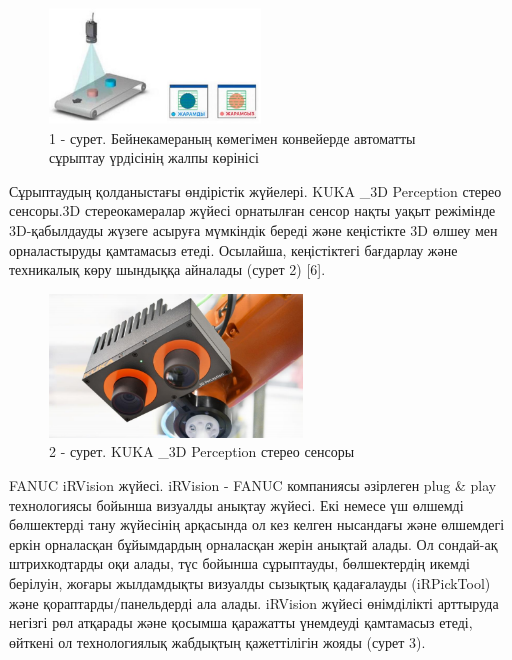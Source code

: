 \begin{figure}[H]
	\centering
	\includegraphics[width=0.5\textwidth]{media/ict2/image168}
	\caption*{1 - сурет. Бейнекамераның көмегімен конвейерде автоматты сұрыптау үрдісінің жалпы көрінісі}

\end{figure}

\begin{multicols}{2}
Сұрыптаудың қолданыстағы өндірістік жүйелері. KUKA \_3D Perception
стерео сенсоры.3D стереокамералар жүйесі орнатылған сенсор нақты уақыт
режімінде 3D-қабылдауды жүзеге асыруға мүмкіндік береді және кеңістікте
3D өлшеу мен орналастыруды қамтамасыз етеді. Осылайша, кеңістіктегі
бағдарлау және техникалық көру шындыққа айналады (сурет 2) {[}6{]}.
\end{multicols}

\begin{figure}[H]
	\centering
	\includegraphics[width=0.6\textwidth]{media/ict2/image169}
	\caption*{2 - сурет. KUKA \_3D Perception стерео сенсоры}
\end{figure}

\begin{multicols}{2}
FANUC iRVision жүйесі. iRVision - FANUC компаниясы әзірлеген plug \&
play технологиясы бойынша визуалды анықтау жүйесі. Екі немесе үш өлшемді
бөлшектерді тану жүйесінің арқасында ол кез келген нысандағы және
өлшемдегі еркін орналасқан бұйымдардың орналасқан жерін анықтай алады.
Ол сондай-ақ штрихкодтарды оқи алады, түс бойынша сұрыптауды,
бөлшектердің икемді берілуін, жоғары жылдамдықты визуалды сызықтық
қадағалауды (iRPickTool) және қораптарды/панельдерді ала алады. iRVision
жүйесі өнімділікті арттыруда негізгі рөл атқарады және қосымша қаражатты
үнемдеуді қамтамасыз етеді, өйткені ол технологиялық жабдықтың
қажеттілігін жояды (сурет 3).
\end{multicols}


